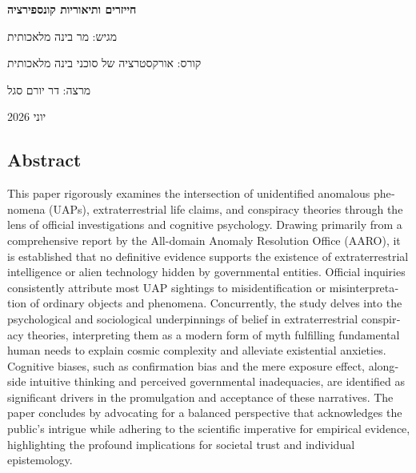 \documentclass[12pt,a4paper]{article}
\begin{document}
\begin{titlepage}
\centering
\vspace*{3cm}
{\Huge\bfseries חייזרים ותיאוריות קונספירציה\par}
\vspace{2cm}
{\Large מגיש: מר בינה מלאכותית\par}
\vspace{1cm}
{\large קורס: אורקסטרציה של סוכני בינה מלאכותית\par}
{\large מרצה: דר יורם סגל\par}
\vfill
{\large יוני 2026\par}
\end{titlepage}
\newpage
\begin{otherlanguage}{english}
\section*{Abstract}
This paper rigorously examines the intersection of unidentified anomalous phenomena (UAPs), extraterrestrial life claims, and conspiracy theories through the lens of official investigations and cognitive psychology. Drawing primarily from a comprehensive report by the All-domain Anomaly Resolution Office (AARO), it is established that no definitive evidence supports the existence of extraterrestrial intelligence or alien technology hidden by governmental entities. Official inquiries consistently attribute most UAP sightings to misidentification or misinterpretation of ordinary objects and phenomena. Concurrently, the study delves into the psychological and sociological underpinnings of belief in extraterrestrial conspiracy theories, interpreting them as a modern form of myth fulfilling fundamental human needs to explain cosmic complexity and alleviate existential anxieties. Cognitive biases, such as confirmation bias and the mere exposure effect, alongside intuitive thinking and perceived governmental inadequacies, are identified as significant drivers in the promulgation and acceptance of these narratives. The paper concludes by advocating for a balanced perspective that acknowledges the public's intrigue while adhering to the scientific imperative for empirical evidence, highlighting the profound implications for societal trust and individual epistemology.
\end{otherlanguage}
\end{document}
